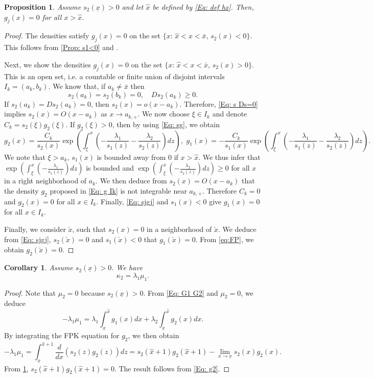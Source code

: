 \documentclass[11pt]{article}
\numberwithin{equation}{section}
\newtheorem{prop}[thm]{Proposition}
\newtheorem{cor}[thm]{Corollary}
\theoremstyle{definition}
\newcommand{\ux}{{\underline x}}
\newcommand{\beq}{\begin{equation}}
\newcommand{\eeq}{\end{equation}}
\newcommand{\ld}{\lambda}
\newcommand{\lc}{\left(}
\newcommand{\rc}{\right)}
\theoremstyle{plain}
\begin{document}
\begin{prop}\label{Prop:s2 hatx}
Assume $s_2(\ux)>0$ and let $\widehat{x}$ be defined by \eqref{Eq: def hx}. Then, $g_j(x)=0$ for all $x> \widehat{x}$. 
\end{prop}
\begin{proof} The densities satisfy $g_j(x)=0$ on the set $\{x:\,\widehat{x}<x<\bar{x},\,s_2(x)<0\}$. This follows from \cref{Prop: s1<0} and .\par
 Next, we show the densities $g_j(x)=0$ on the set $\{x:\,\widehat{x}<x<\bar{x},\,s_2(x)>0\}$. This is an open set, i.e. a countable or finite union of disjoint intervals $I_k=(a_k,b_k)$. We know that, if $a_k\neq  \bar{x}$ then
\beq\label{Eq: s Ds=0}
s_2(a_k)=s_2(b_k)=0,\quad Ds_2(a_k)\geq 0.
\eeq
{If $s_2(a_k)=Ds_2(a_k)=0$, then $s_2(x)=o(x-a_k)$. Therefore, \cref{Eq: s Ds=0} implies $s_2(x)=O(x-a_k)$ as $x\to a_{k,+}$.} We now choose $\xi\in I_k$ and denote $C_k=s_2(\xi)g_2(\xi)$. If $g_2(\xi)>0$, then by using \cref{Eq: sg}, we obtain
 \beq\label{Eq: g Ik}
 g_2(x)=\frac{C_k}{s_2(x)}\exp\lc \int_{\xi}^x\lc -\frac{\ld_1}{s_1(z)}-\frac{\ld_2}{s_2(z)}\rc dz\rc,\,\,g_1(x)=-\frac{C_k}{s_1(x)}\exp\lc \int_{\xi}^x\lc -\frac{\ld_1}{s_1(z)}-\frac{\ld_2}{s_2(z)}\rc dz\rc.
 \eeq
{We note that $\xi>a_k$, $s_1(x)$ is bounded away from $0$ if $x>\widehat{x}$. We thus infer that $\exp\lc \int_{\xi}^x\lc -\frac{\ld_1}{s_1(z)}\rc dz\rc$ is bounded and $\exp\lc \int_{\xi}^x\lc -\frac{\ld_2}{s_2(z)}\rc dz\rc\geq 0$ for all $x$ in a right neighborhood of $a_k$. We then deduce from $s_2(x)=O(x-a_k)$ that the density $g_2$ proposed in \cref{Eq: g Ik} is not integrable near $a_{k,+}$.} Therefore $C_k=0$ and $g_2(x)=0$ for all $x\in I_k$. Finally, \cref{Eq: sjgj} and $s_1(x)<0$ give $g_1(x)=0$ for all $x\in I_k$.\par
Finally, we consider $\check{x}$, such that $s_2(x)=0$ in a neighborhood of $\check{x}$. We deduce from \cref{Eq: sjgj}, $s_2(\check{x})=0$ and $s_1(\check{x})<0$ that $g_1(\check{x})=0$. From \cref{eq:FP}, we obtain $g_2(\check{x})=0$. 
\end{proof}
\begin{cor}
Assume $s_2(\ux)>0$. We have 
$$
\kappa_2=\ld_1\mu_1. 
$$
\end{cor}
\begin{proof}
Note that $\mu_2=0$ because $s_2(\ux)>0$. From \eqref{Eq: G1 G2} and $\mu_2=0$, we deduce
$$
-\ld_1\mu_1=\ld_1\int_{\ux}^{\widehat{x}}g_1(x)dx+\ld_2\int_{\ux}^{\widehat{x}}g_2(x)dx.
$$
By integrating the FPK equation for $g_2$, we then obtain
$$
-\ld_1\mu_1=\int_{\ux}^{\widehat{x}+1}\frac{d}{dx}\lc s_2(z)g_2(z)\rc dz= s_2(\widehat{x}+1)g_2(\widehat{x}+1)-\lim_{x\to \ux}s_2(x)g_2(x).
$$
From \cref{Prop:s2 hatx}, $s_2(\widehat{x}+1)g_2(\widehat{x}+1)=0$. The result follows from \eqref{Eq: g2}.
\end{proof}
\end{document}
